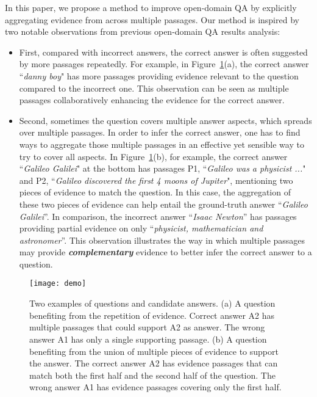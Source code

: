 \documentclass{article} \usepackage{iclr2018_conference,times}
\begin{document}
In this paper, we propose a method to improve open-domain QA by explicitly aggregating evidence from across multiple passages. 
Our method is inspired by two notable observations from previous open-domain QA results analysis:
\begin{itemize}[labelindent=0.5em,labelsep=0.2cm,leftmargin=0.5cm]
\item First, compared with incorrect answers, the correct answer is often suggested by more passages repeatedly. 
For example, in Figure~\ref{fig:demo}(a), the correct answer ``\emph{danny boy}" has more passages providing evidence relevant to the question compared to the incorrect one.
This observation can be seen as multiple passages collaboratively enhancing the evidence for the correct answer.
\item Second, sometimes the question covers multiple answer aspects, which spreads over multiple passages. In order to infer the correct answer, one has to find ways to aggregate those multiple passages in an effective yet sensible way to try to cover all aspects.
In Figure~\ref{fig:demo}(b), for example, the correct answer ``\emph{Galileo Galilei}" at the bottom has passages P1, ``\emph{Galileo was a physicist ...}" and P2, ``\emph{Galileo discovered the first 4 moons of Jupiter}", mentioning two pieces of evidence to match the question. In this case, the aggregation of these two pieces of evidence can help entail the ground-truth answer ``\emph{Galileo Galilei}''. 
In comparison, the incorrect answer ``\emph{Isaac Newton}'' has passages providing partial evidence on only ``\emph{physicist, mathematician and astronomer}''.
This observation illustrates the way in which multiple passages may provide \textbf{\emph{complementary}} evidence to better infer the correct answer to  a question.  

\end{itemize}

\begin{figure}[t]
\centering
\texttt{[image: demo]}
\vspace{-0.3in}
\caption{\small{Two examples of questions and candidate answers. (a) A question benefiting from the repetition of evidence. Correct answer A2 has multiple passages that could support A2 as answer. The wrong answer A1 has only a single supporting passage. (b) A question benefiting from the union of multiple pieces of evidence to support the answer. The correct answer A2 has evidence passages that can match both the first half and the second half of the question. The wrong answer A1 has evidence passages covering only the first half.}}
\label{fig:demo}
\end{figure}
\end{document}
